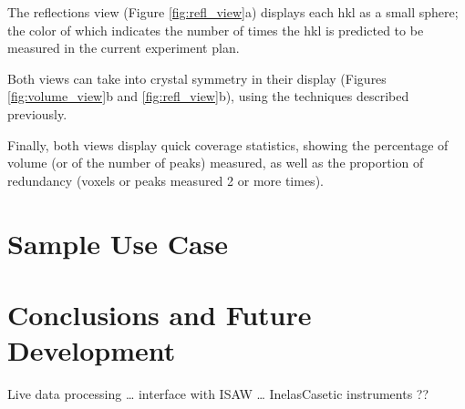 \documentclass{iucr}              %
\begin{document}
The reflections view (Figure \ref{fig:refl_view}a) displays each hkl as a
small sphere; the color of which indicates the number of times the hkl is predicted to be measured
in the current experiment plan.       

Both views can take into crystal symmetry in their display (Figures
\ref{fig:volume_view}b and \ref{fig:refl_view}b), using the techniques described
previously.
 
Finally, both views display quick coverage statistics, showing the percentage of
volume (or of the number of peaks) measured, as well as the proportion of
redundancy (voxels or peaks measured 2 or more times).     

\section{Sample Use Case}


\section{Conclusions and Future Development}


Live data processing    …  interface with ISAW … InelasCasetic instruments ??























\end{document}
